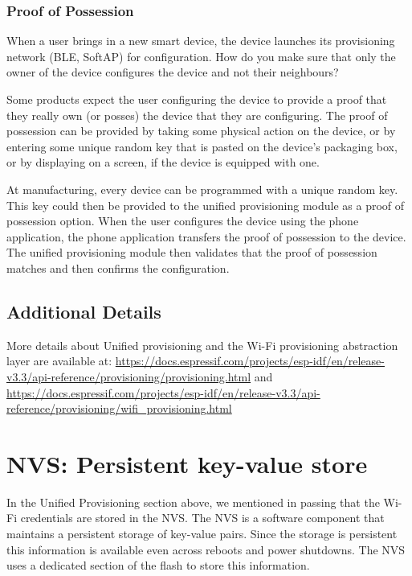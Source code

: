 \documentclass[main.tex]{subfiles}
\begin{document}
\subsubsection{Proof of Possession}

When a user brings in a new smart device, the device launches its provisioning network (BLE, SoftAP) for configuration.  How do you make sure that only the owner of the device configures the device and not their neighbours?

Some products expect the user configuring the device to provide a proof that they really own (or posses) the device that they are configuring. The proof of possession can be provided by taking some physical action on the device, or by entering some unique random key that is pasted on the device's packaging box, or by displaying on a screen, if the device is equipped with one.

At manufacturing, every device can be programmed with a unique random key. This key could then be provided to the unified provisioning module as a proof of possession option. When the user configures the device using the phone application, the phone application transfers the proof of possession to the device. The unified provisioning module then validates that the proof of possession matches and then confirms the configuration.

\subsection{Additional Details}

More details about Unified provisioning and the Wi-Fi provisioning abstraction layer are available at: \url{https://docs.espressif.com/projects/esp-idf/en/release-v3.3/api-reference/provisioning/provisioning.html} and \url{https://docs.espressif.com/projects/esp-idf/en/release-v3.3/api-reference/provisioning/wifi_provisioning.html}

\section{NVS: Persistent key-value store}\label{sec:nvs_info}
In the Unified Provisioning section above, we mentioned in passing that the Wi-Fi credentials are stored in the NVS. The NVS is a software component that maintains a persistent storage of key-value pairs. Since the storage is persistent this information is available even across reboots and power shutdowns. The NVS uses a dedicated section of the flash to store this information.
\end{document}
